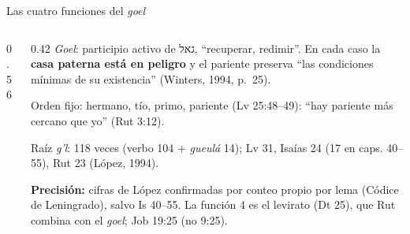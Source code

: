 \documentclass[hyperref={bookmarks=false},aspectratio=169]{beamer}
\newcommand{\heb}[1]{\mbox{\foreignlanguage{hebrew}{#1}}}
\newcommand{\destacar}[1]{\textbf{\textcolor{tierraroja}{#1}}}
\newcommand{\precision}[1]{{\footnotesize\color{sepia}\textbf{Precisión:} #1}}
\begin{document}
\begin{frame}{Las cuatro funciones del \emph{goel}}
\begin{columns}[c,onlytextwidth]
\begin{column}{0.56\textwidth}
\centering
{}
\end{column}
\begin{column}{0.42\textwidth}\scriptsize\RaggedRight
\emph{Goel}: participio activo de \heb{גאל}, ``recuperar, redimir''. En cada caso la \destacar{casa paterna está en peligro} y el pariente preserva ``las condiciones mínimas de su existencia'' (Winters, 1994, p.~25).\par\medskip
Orden fijo: hermano, tío, primo, pariente (Lv 25:48--49): ``hay pariente más cercano que yo'' (Rut 3:12).\par\medskip
Raíz \emph{g'l}: 118 veces (verbo 104 + \emph{gueulá} 14); Lv 31, Isaías 24 (17 en caps. 40--55), Rut 23 (López, 1994).\par\smallskip
\precision{cifras de López confirmadas por conteo propio por lema (Códice de Leningrado), salvo Is 40--55. La función 4 es el levirato (Dt 25), que Rut combina con el \emph{goel}; Job 19:25 (no 9:25).}
\end{column}
\end{columns}
\end{frame}
\end{document}
